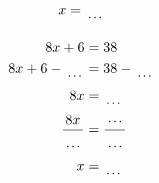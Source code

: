 \documentclass[12pt]{article}
\newcounter{minipagecount}
\begin{document}
\begin{multicols}{2}
\begin{minipage}[t]{0.45\textwidth}
\begin{align*}
        x &= \dotuline{\hspace{5mm}}\\
    \end{align*}
\end{minipage} %
\noindent{(\theminipagecount)}\hspace{0.1mm} %
\begin{minipage}[t]{0.45\textwidth} %
    \vspace{-26pt}  %
    \raggedright %
    \begin{align*} %
        8x + 6 &= 38\\
        8x + 6 - \dotuline{\hspace{5mm}} &= 38 - \dotuline{\hspace{5mm}}\\
        8x &= \dotuline{\hspace{5mm}}\\
        \frac{8x}{\dotuline{\hspace{5mm}}} &= \frac{\dotuline{\hspace{5mm}}}{\dotuline{\hspace{5mm}}}\\
        x &= \dotuline{\hspace{5mm}}\\
    \end{align*}
\end{minipage} %
\noindent{(\theminipagecount)}\hspace{0.1mm} %
\begin{minipage}[t]{0.45\textwidth} %
    \vspace{-26pt}  %

\end{minipage}
\end{multicols}
\end{document}
